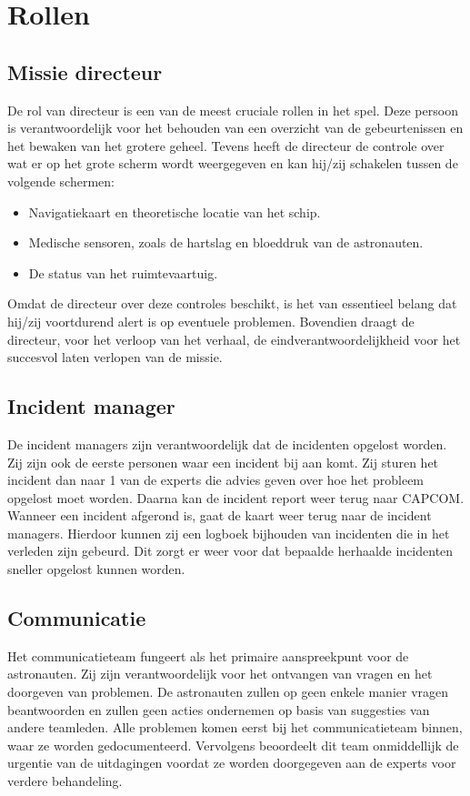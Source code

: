 \documentclass[
	a4paper, %
	10pt, %
	unnumberedsections, %
	twoside, %
]{LTJournalArticle}
\begin{document}
\section{Rollen}

\subsection{Missie directeur}

De rol van directeur is een van de meest cruciale rollen in het spel. Deze persoon is verantwoordelijk voor het behouden van een overzicht van de gebeurtenissen en het bewaken van het grotere geheel. Tevens heeft de directeur de controle over wat er op het grote scherm wordt weergegeven en kan hij/zij schakelen tussen de volgende schermen:
\begin{itemize}
    \item Navigatiekaart en theoretische locatie van het schip.
    \item Medische sensoren, zoals de hartslag en bloeddruk van de astronauten.
    \item De status van het ruimtevaartuig.
\end{itemize}
Omdat de directeur over deze controles beschikt, is het van essentieel belang dat hij/zij voortdurend alert is op eventuele problemen. Bovendien draagt de directeur, voor het verloop van het verhaal, de eindverantwoordelijkheid voor het succesvol laten verlopen van de missie.

\subsection{Incident manager}
De incident managers zijn verantwoordelijk dat de incidenten opgelost worden. Zij zijn ook de eerste personen waar een incident bij aan komt. Zij sturen het incident dan naar 1 van de experts die advies geven over hoe het probleem opgelost moet worden. Daarna kan de incident report weer terug naar CAPCOM. Wanneer een incident afgerond is, gaat de kaart weer terug naar de incident managers. Hierdoor kunnen zij een logboek bijhouden van incidenten die in het verleden zijn gebeurd. Dit zorgt er weer voor dat bepaalde herhaalde incidenten sneller opgelost kunnen worden.

\subsection{Communicatie}

Het communicatieteam fungeert als het primaire aanspreekpunt voor de astronauten. Zij zijn verantwoordelijk voor het ontvangen van vragen en het doorgeven van problemen. De astronauten zullen op geen enkele manier vragen beantwoorden en zullen geen acties ondernemen op basis van suggesties van andere teamleden. Alle problemen komen eerst bij het communicatieteam binnen, waar ze worden gedocumenteerd. Vervolgens beoordeelt dit team onmiddellijk de urgentie van de uitdagingen voordat ze worden doorgegeven aan de experts voor verdere behandeling.
\end{document}
